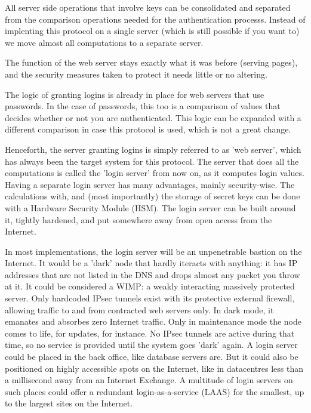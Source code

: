 All server side operations that involve keys can be consolidated and separated from the comparison operations needed for the authentication processs.
Instead of implenting this protocol on a single server
(which is still possible if you want to)
we move almost all computations to a separate server.
\par
The function of the web server stays exactly what it was before (serving pages),
and the security measures taken to protect it needs little or no altering.
\par
The logic of granting logins is already in place for web servers that use passwords.
In the case of passwords, this too is a comparison of values that decides whether or not you are authenticated.
This logic can be expanded with a different comparison in case this protocol is used, which is not a great change.
\par
Henceforth, the server granting logins
is simply referred to as 'web server',
which has always been the target system for this protocol.
The server that does all the computations is called the 'login server' from now on, as it computes login values.
Having a separate login server has many advantages, mainly security-wise.
The calculations with, and (most importantly) the storage of secret keys can be done with a Hardware Security Module (HSM).
The login server can be built around it, tightly hardened, and put somewhere away from open access from the Internet.
\par
In most implementations, the login server will be an unpenetrable bastion on the Internet.
It would be a 'dark' node that hardly iteracts with anything:
it has IP addresses that are not listed in the DNS and drops almost any packet you throw at it.
It could be considered a WIMP: a weakly interacting massively protected server.
Only hardcoded IPsec tunnels exist with its protective external firewall, allowing traffic to and from contracted web servers only.
In dark mode, it emanates and absorbes zero Internet traffic.
Only in maintenance mode the node comes to life, for updates, for instance.
No IPsec tunnels are active during that time, so no service is provided until the system goes 'dark' again.
A login server could be placed in the back office, like database servers are.
But it could also be positioned on highly accessible spots on the Internet, like in datacentres less than a millisecond away from an Internet Exchange.
A multitude of login servers on such places could offer a redundant login-as-a-service (LAAS) for the smallest, up to the largest sites on the Internet.
